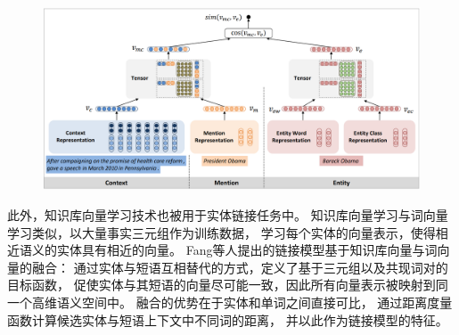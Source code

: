 \begin{figure}[th]
	\centering
    \includegraphics[width=0.95\columnwidth]{figure/rw/linking-sun.png}
	\label{fig:rw-linking-sun}
\end{figure}

此外，知识库向量学习技术\cite{bordes2013translating}也被用于实体链接任务中。
知识库向量学习与词向量学习类似，以大量事实三元组作为训练数据，
学习每个实体的向量表示，使得相近语义的实体具有相近的向量。
Fang等人\cite{fang2016entity}提出的链接模型基于知识库向量与词向量的融合：
通过实体与短语互相替代的方式，定义了基于三元组以及共现词对的目标函数，
促使实体与其短语的向量尽可能一致，因此所有向量表示被映射到同一个高维语义空间中。
融合的优势在于实体和单词之间直接可比，
通过距离度量函数计算候选实体与短语上下文中不同词的距离，
并以此作为链接模型的特征。











